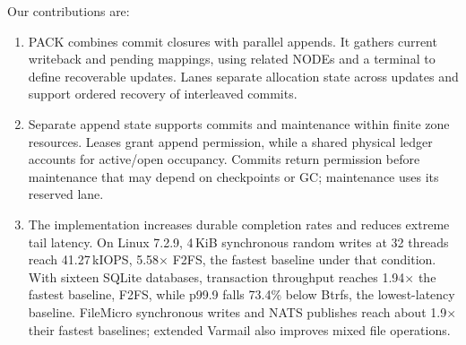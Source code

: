 Our contributions are:
\begin{enumerate}
\item PACK combines commit closures with parallel appends.
It gathers current writeback and pending mappings, using related NODEs and a terminal to define recoverable updates.
Lanes separate allocation state across updates and support ordered recovery of interleaved commits.
\item Separate append state supports commits and maintenance within finite zone resources.
Leases grant append permission, while a shared physical ledger accounts for active/open occupancy.
Commits return permission before maintenance that may depend on checkpoints or GC; maintenance uses its reserved lane.
\item The implementation increases durable completion rates and reduces extreme tail latency.
On Linux 7.2.9, 4\,KiB synchronous random writes at 32 threads reach 41.27\,kIOPS, 5.58$\times$ F2FS, the fastest baseline under that condition.
With sixteen SQLite databases, transaction throughput reaches 1.94$\times$ the fastest baseline, F2FS, while p99.9 falls 73.4\% below Btrfs, the lowest-latency baseline.
FileMicro synchronous writes and NATS publishes reach about 1.9$\times$ their fastest baselines; extended Varmail also improves mixed file operations.
\end{enumerate}
